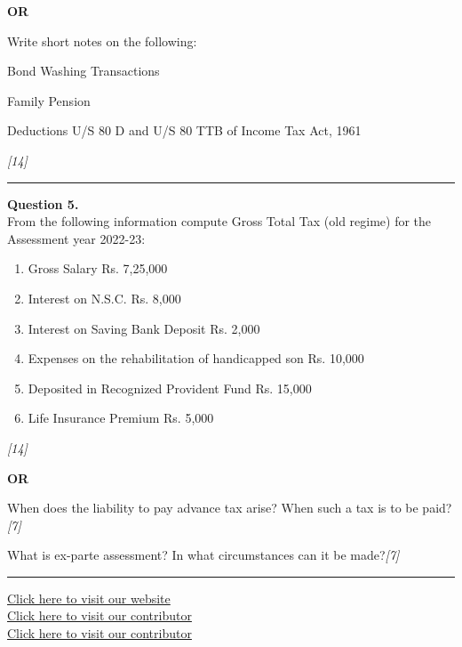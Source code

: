 \documentclass[11pt,a4paper]{article}
\newcommand{\pts}[1]{\hfill   \textit{[#1]}}
\begin{document}
\centerline{   \textbf{OR}}




\noindent Write short notes on the following:

\begin{parts}
  \item Bond Washing Transactions
  \item Family Pension
  \item Deductions U/S 80 D and U/S 80 TTB of Income Tax Act, 1961
\end{parts}\pts{14}

\medskip\rule{\linewidth}{0.2pt}




\noindent   \textbf{Question 5.} \\
From the following information compute Gross Total Tax (old regime) for the Assessment year 2022-23:

\begin{enumerate}[label=(\roman*),leftmargin=*]
  \item Gross Salary \hfill Rs. 7,25,000
  \item Interest on N.S.C. \hfill Rs. 8,000
  \item Interest on Saving Bank Deposit \hfill Rs. 2,000
  \item Expenses on the rehabilitation of handicapped son \hfill Rs. 10,000
  \item Deposited in Recognized Provident Fund \hfill Rs. 15,000
  \item Life Insurance Premium \hfill Rs. 5,000
\end{enumerate}\pts{14}

\centerline{   \textbf{OR}}


\begin{parts}
  \item When does the liability to pay advance tax arise? When such a tax is to be paid?\pts{7}
  \item What is ex-parte assessment? In what circumstances can it be made?\pts{7}
\end{parts}

\vfill
\rule{\linewidth}{0.4pt}

\begin{center}\small
\href{https://bhu-exam.vercel.app/}{Click here to visit our website}\\[4pt]
\href{https://me-aryan.vercel.app/}{Click here to visit our contributor}\\[4pt]
\href{https://quashan-me.vercel.app/}{Click here to visit our contributor}
\end{center}
\end{document}
